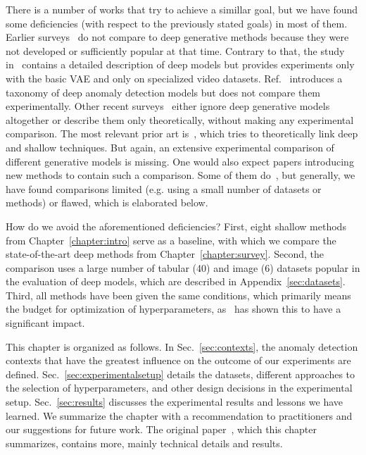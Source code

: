 There is a number of works that try to achieve a simillar goal, but we have found some deficiencies (with respect to the previously stated goals) in most of them. Earlier surveys~\cite{pimentel2014review, campos2016evaluation, goldstein2016comparative, pevny2016loda} do not compare to deep generative methods because they were not developed or sufficiently popular at that time. Contrary to that, the study in~\cite{kiran2018overview} contains a detailed description of deep models but provides experiments only with the basic VAE and only on specialized video datasets. Ref.~\cite{chalapathy2019deep} introduces a taxonomy of deep anomaly detection models but does not compare them experimentally. Other recent surveys~\cite{moustafa2019holistic, kwon2019survey, fernandes2019comprehensive, wang2019progress, pang2020deep} either ignore deep generative models altogether or describe them only theoretically, without making any experimental comparison. The most relevant prior art is~\cite{ruff2020unifying}, which tries to theoretically link deep and shallow techniques. But again, an extensive experimental comparison of different generative models is missing. One would also expect papers introducing new methods to contain such a comparison. Some of them do~\cite{pevny2016loda}, but generally, we have found comparisons limited (e.g. using a small number of datasets or methods) or flawed, which is elaborated below.

How do we avoid the aforementioned deficiencies? First, eight shallow methods from Chapter~\ref{chapter:intro} serve as a baseline, with which we compare the state-of-the-art deep methods from Chapter~\ref{chapter:survey}. Second, the comparison uses a large number of tabular (40) and image (6) datasets popular in the evaluation of deep models, which are described in Appendix~\ref{sec:datasets}. Third, all methods have been given the same conditions, which primarily means the budget for optimization of hyperparameters, as~\cite{vskvara2018generative} has shown this to have a significant impact.

This chapter is organized as follows. In Sec.~\ref{sec:contexts}, the anomaly detection contexts that have the greatest influence on the outcome of our experiments are defined. Sec.~\ref{sec:experimentalsetup} details the datasets,  different approaches to the selection of hyperparameters, and other design decisions in the experimental setup. Sec.~\ref{sec:results} discusses the experimental results and lessons we have learned. We summarize the chapter with a recommendation to practitioners and our suggestions for future work. The original paper~\cite{vskvara2021comparison}, which this chapter summarizes, contains more, mainly technical details and results.

